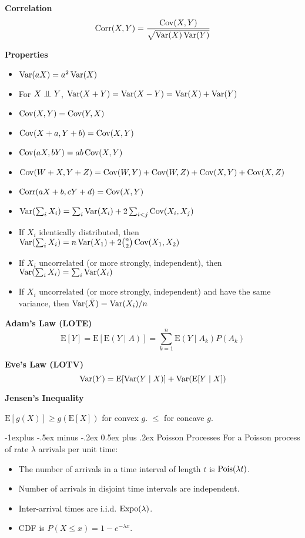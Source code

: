 \documentclass[10pt,landscape]{article}
\makeatletter
\newcommand\independent{\protect\mathpalette{\protect\independenT}{\perp}}
\def\independenT#1#2{\mathrel{\setbox0\hbox{$#1#2$}%
    \copy0\kern-\wd0\mkern4mu\box0}}
\renewcommand{\subsection}{\@startsection{subsection}{2}{0mm}%
                                {-1explus -.5ex minus -.2ex}%
                                {0.5ex plus .2ex}%
                                {\normalfont\normalsize\bfseries}}
\newcommand{\E}{\text{E}}
\makeatother
\begin{document}
\begin{multicols*}{3}
\textbf{Correlation}
$$\text{Corr}(X,Y)=\frac{\operatorname{Cov}(X,Y)}{\sqrt{\operatorname{Var}(X)\operatorname{Var}(Y)}}$$

\textbf{Properties}
\begin{itemize}
    \item $\operatorname{Var}(aX)=a^2\operatorname{Var}(X)$
    \item For $X\independent Y$, $\operatorname{Var}(X+Y)=\operatorname{Var}(X-Y)=\operatorname{Var}(X)+\operatorname{Var}(Y)$
    \item $\operatorname{Cov}(X,Y)=\operatorname{Cov}(Y,X)$
    \item $\operatorname{Cov}(X+a,Y+b)=\operatorname{Cov}(X,Y)$
    \item $\operatorname{Cov}(aX,bY)=ab\operatorname{Cov}(X,Y)$
    \item $\operatorname{Cov}(W+X,Y+Z)=\operatorname{Cov}(W,Y)+\operatorname{Cov}(W,Z)+\operatorname{Cov}(X,Y)+\operatorname{Cov}(X,Z)$
    \item $\text{Corr}(aX+b,cY+d)=\operatorname{Cov}(X,Y)$
    \item $\operatorname{Var}(\sum_i X_i)=\sum_i\operatorname{Var}(X_i)+2\sum_{i<j}\operatorname{Cov}(X_i,X_j)$
    \item If $X_i$ identically distributed, then $\operatorname{Var}(\sum_i X_i)=n\operatorname{Var}(X_1)+2\binom{n}{2}\operatorname{Cov}(X_1,X_2)$
    \item If $X_i$ uncorrelated (or more strongly, independent), then $\operatorname{Var}(\sum_i X_i)=\sum_i\operatorname{Var}( X_i)$
    \item If $X_i$ uncorrelated (or more strongly, independent) and have the same variance, then $\operatorname{Var}(\bar X)=\operatorname{Var}(X_i)/n$
\end{itemize}

\textbf{Adam's Law (LOTE)}
$$\E[Y]=\E[\E(Y\mid A)]=\sum_{k=1}^n\E(Y\mid A_k)P(A_k)$$

\textbf{Eve's Law (LOTV)}
$$\Var(Y)=\E[\Var(Y\mid X)]+\Var(\E[Y\mid X])$$

\textbf{Jensen's Inequality}

$\E[g(X)]\geq g(\E[X])$ for convex $g$. $\leq$ for concave $g$.

\subsection{Poisson Processes}
For a Poisson process of rate $\lambda$ arrivals per unit time:
\begin{itemize}
    \item The number of arrivals in a time interval of length $t$ is $\operatorname{Pois}(\lambda t)$.
    \item Number of arrivals in disjoint time intervals are independent.
    \item Inter-arrival times are i.i.d. $\operatorname{Expo}(\lambda)$.
    \item CDF is $P(X\leq x)=1-e^{-\lambda x}$.
\end{itemize}


\end{multicols*}
\end{document}
